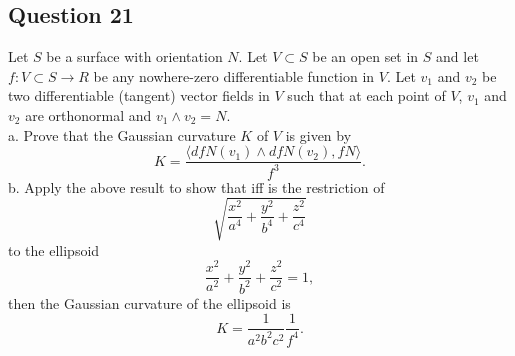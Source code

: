 \documentclass[12pt]{article}
\begin{document}
\subsection*{Question 21}
Let $S$ be a surface with orientation $N$. Let $V \subset S$ be an open set in $S$ and let $f : V \subset S \to R$ be any nowhere-zero differentiable function in $V$. Let $v_1$ and $v_2$ be two differentiable (tangent) vector fields in $V$ such that at each point of $V$, $v_1$ and $v_2$ are orthonormal and $v_1 \wedge v_2 = N$.\\
a. Prove that the Gaussian curvature $K$ of $V$ is given by \begin{equation*}
    K = \frac{\langle dfN(v_1)\wedge dfN(v_2),fN\rangle}{f^3}.
\end{equation*}
b. Apply the above result to show that iff is the restriction of \begin{equation*}
    \sqrt{\frac{x^2}{a^4}+\frac{y^2}{b^4}+\frac{z^2}{c^4}}
\end{equation*}
to the ellipsoid \begin{equation*}
    \frac{x^2}{a^2}+\frac{y^2}{b^2}+\frac{z^2}{c^2}=1,
\end{equation*}
 then the Gaussian curvature of the ellipsoid is\begin{equation*}
     K = \frac{1}{a^2b^2c^2}\frac{1}{f^4}.
\end{equation*}
 
\end{document}
